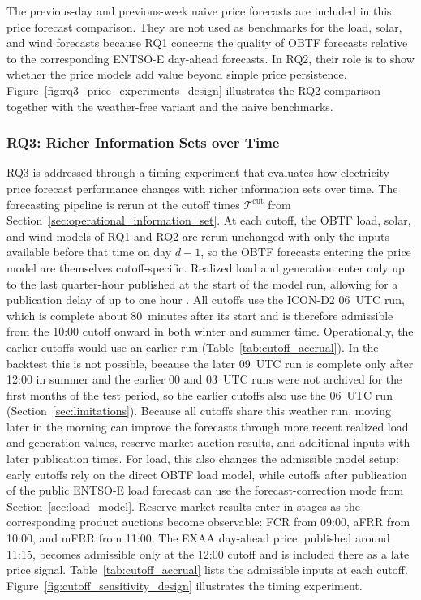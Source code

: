 The previous-day and previous-week naive price forecasts are included in this
price forecast comparison. They are not used as benchmarks for the load, solar,
and wind forecasts because RQ1 concerns the quality of
OBTF forecasts relative to the corresponding \mbox{ENTSO-E}
day-ahead forecasts. In RQ2, their role is to show whether the price
models add value beyond simple price persistence.
Figure~\ref{fig:rq3_price_experiments_design} illustrates the RQ2 comparison
together with the weather-free variant and the naive benchmarks.



\FloatBarrier

\subsubsection{RQ3: Richer Information Sets over Time}
\label{sec:cutoff_sensitivity}

\hyperlink{rq:cutoff_sensitivity}{RQ3} is addressed through a
timing experiment that evaluates how electricity price forecast
performance changes with richer information sets over time. The
forecasting pipeline is rerun at the cutoff times
\(\mathcal{T}^{\mathrm{cut}}\) from Section~\ref{sec:operational_information_set}.
At each cutoff, the OBTF load, solar, and wind models of RQ1 and RQ2 are rerun
unchanged with only the inputs available before that time on day \(d-1\), so the OBTF forecasts entering the price model are themselves
cutoff-specific. Realized load and generation enter only up to the last
quarter-hour published at the start of the model run, allowing for a
publication delay of up to one hour \cite{euRegulation543_2013}. All cutoffs use the \mbox{ICON-D2} 06~UTC run, which is
complete about 80~minutes after its start and is therefore admissible from the
10:00 cutoff onward in both winter and summer time. Operationally, the earlier
cutoffs would use an earlier run (Table~\ref{tab:cutoff_accrual}). In the backtest this is not
possible, because the later 09~UTC run is complete only after 12:00 in summer
and the earlier 00 and 03~UTC runs were not archived for the first months of
the test period, so the
earlier cutoffs also use the 06~UTC run (Section~\ref{sec:limitations}). Because
all cutoffs share this weather run, moving
later in the morning can improve the forecasts through more recent realized load
and generation values, reserve-market auction results, and additional inputs
with later publication times. For load, this also
changes the admissible model setup: early cutoffs rely on the direct OBTF load model, while cutoffs after publication of the public
\mbox{ENTSO-E} load forecast can use the forecast-correction mode from
Section~\ref{sec:load_model}. Reserve-market results enter in stages as the
corresponding product auctions become observable: FCR
from 09:00, aFRR from 10:00, and mFRR from 11:00. The EXAA day-ahead price, published around 11:15,
becomes admissible only at the 12:00 cutoff and is included
there as a late price signal.
Table~\ref{tab:cutoff_accrual} lists the admissible inputs at each cutoff. Figure~\ref{fig:cutoff_sensitivity_design} illustrates
the timing experiment.

